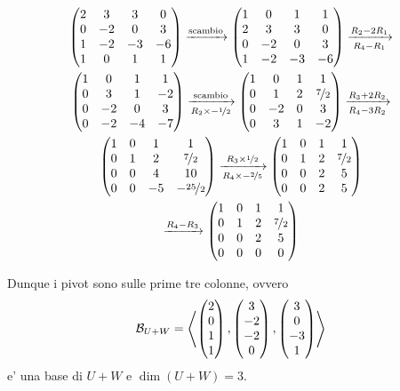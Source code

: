 \begin{example}
    \begin{gather*}
        \begin{pmatrix} 2 & 3 & 3 & 0 \\ 0 & -2 & 0 & 3  \\ 1 & -2 & -3 & -6 \\ 1 & 0 & 1 & 1 \end{pmatrix} \xrightarrow[]{\text{scambio}}
        \begin{pmatrix} 1 & 0 & 1 & 1 \\ 2 & 3 & 3 & 0 \\ 0 & -2 & 0 & 3  \\ 1 & -2 & -3 & -6   \end{pmatrix} \xrightarrow[R_4 - R_1]{R_2 - 2R_1} \\
        \begin{pmatrix} 1 & 0 & 1 & 1 \\ 0 & 3 & 1 & -2 \\ 0 & -2 & 0 & 3  \\ 0 & -2 & -4 & -7   \end{pmatrix} \xrightarrow[R_2 \times -\nicefrac12]{\text{scambio}}
        \begin{pmatrix} 1 & 0 & 1 & 1 \\ 0 & 1 & 2 & \nicefrac72\\ 0 & -2 & 0 & 3  \\  0 & 3 & 1 & -2   \end{pmatrix} \xrightarrow[R_4 - 3R_2]{R_3 + 2R_2}\\
        \begin{pmatrix} 1 & 0 & 1 & 1 \\ 0 & 1 & 2 & \nicefrac72\\ 0 & 0 & 4 & 10  \\  0 & 0 & -5 & -\nicefrac{25}{2}   \end{pmatrix} \xrightarrow[R_4 \times -\nicefrac25]{R_3 \times \nicefrac12}
        \begin{pmatrix} 1 & 0 & 1 & 1 \\ 0 & 1 & 2 & \nicefrac72\\ 0 & 0 & 2& 5  \\  0 & 0 & 2 & 5   \end{pmatrix} \\\xrightarrow[]{R_4 - R_3}
        \begin{pmatrix} 1 & 0 & 1 & 1 \\ 0 & 1 & 2 & \nicefrac72\\ 0 & 0 & 2& 5  \\  0 & 0 & 0 & 0   \end{pmatrix}
    \end{gather*}

    Dunque i pivot sono sulle prime tre colonne, ovvero \[
        \mathcal{B}_{U + W} = \left\langle \begin{pmatrix} 2\\0\\1\\1 \end{pmatrix}, \begin{pmatrix} 3\\-2\\-2\\0 \end{pmatrix}, \begin{pmatrix} 3\\0\\-3\\1 \end{pmatrix} \right\rangle    
    \] e' una base di $U+W$ e $\dim(U + W) = 3$.


\end{example}
